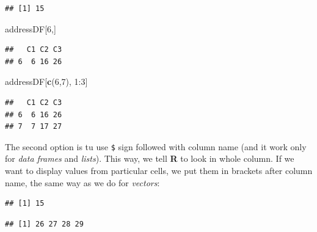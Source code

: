 \documentclass[]{book}
\newenvironment{Shaded}{\begin{snugshade}}{\end{snugshade}}
\newcommand{\KeywordTok}[1]{\textcolor[rgb]{0.12,0.11,0.11}{\textbf{#1}}}
\newcommand{\DecValTok}[1]{\textcolor[rgb]{0.69,0.50,0.00}{#1}}
\newcommand{\OperatorTok}[1]{\textcolor[rgb]{0.12,0.11,0.11}{#1}}
\newcommand{\NormalTok}[1]{\textcolor[rgb]{0.12,0.11,0.11}{#1}}
\theoremstyle{definition}
\theoremstyle{definition}
\theoremstyle{definition}
\theoremstyle{remark}
\begin{document}
\begin{verbatim}
## [1] 15
\end{verbatim}

\begin{Shaded}
\begin{Highlighting}[]
\NormalTok{addressDF[}\DecValTok{6}\NormalTok{,]}
\end{Highlighting}
\end{Shaded}

\begin{verbatim}
##   C1 C2 C3
## 6  6 16 26
\end{verbatim}

\begin{Shaded}
\begin{Highlighting}[]
\NormalTok{addressDF[}\KeywordTok{c}\NormalTok{(}\DecValTok{6}\NormalTok{,}\DecValTok{7}\NormalTok{), }\DecValTok{1}\OperatorTok{:}\DecValTok{3}\NormalTok{]}
\end{Highlighting}
\end{Shaded}

\begin{verbatim}
##   C1 C2 C3
## 6  6 16 26
## 7  7 17 27
\end{verbatim}

The second option is tu use \texttt{\$} sign followed with column name
(and it work only for \emph{data frames} and \emph{lists}). This way, we
tell \textbf{R} to look in whole column. If we want to display values
from particular cells, we put them in brackets after column name, the
same way as we do for \emph{vectors}:

\begin{Shaded}
\end{Shaded}

\begin{verbatim}
## [1] 15
\end{verbatim}

\begin{Shaded}
\end{Shaded}

\begin{verbatim}
## [1] 26 27 28 29
\end{verbatim}
\end{document}
